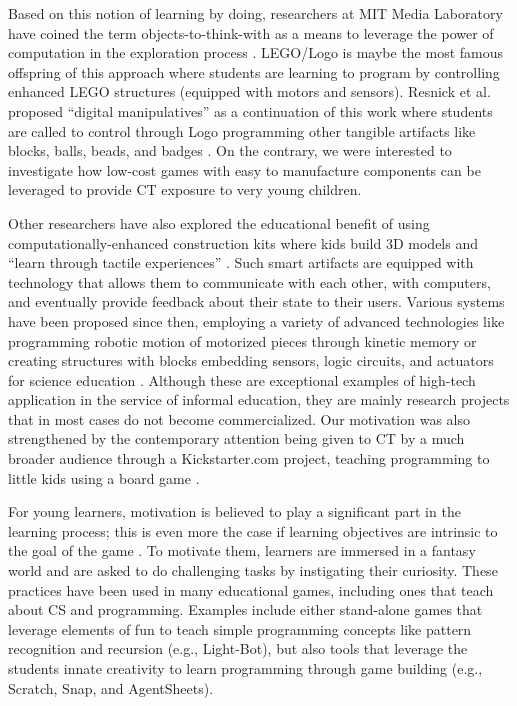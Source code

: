 \documentclass{acm_proc_article-sp}
\begin{document}
Based on this notion of learning by doing, researchers at MIT Media Laboratory have coined the term objects-to-think-with as a means to leverage the power of computation in the exploration process \cite{resnick1998digital,schweikardt2006roblocks}. LEGO/Logo is maybe the most famous offspring of this approach where students are learning to program by controlling enhanced LEGO structures (equipped with motors and sensors).
Resnick et al. proposed ``digital manipulatives'' as a continuation of this work where students are called to control through Logo programming other tangible artifacts like blocks, balls, beads, and badges \cite{liebschner1992child}.
On the contrary, we were interested to investigate how low-cost games with easy to manufacture components can be leveraged to provide CT exposure to very young children. 

Other researchers have also explored the educational benefit of using computationally-enhanced construction kits where kids build 3D models and ``learn through tactile experiences'' \cite{eisenberg2002computationally}.
Such smart artifacts are equipped with technology that allows them to communicate with each other, with computers, and eventually provide feedback about their state to their users.
Various systems have been proposed since then, employing a variety of advanced technologies like programming robotic motion of motorized pieces through kinetic memory \cite{raffle2004topobo} or creating structures with blocks embedding sensors, logic circuits, and actuators for science education \cite{schweikardt2006roblocks}.
Although these are exceptional examples of high-tech application in the service of informal education, they are mainly research projects that in most cases do not become commercialized.
Our motivation was also strengthened by the contemporary attention being given to CT by a much broader audience through a Kickstarter.com project, teaching programming to little kids using a board game \cite{robotturtles}.

For young learners, motivation is believed to play a significant part in the learning process; this is even more the case if learning objectives are intrinsic to the goal of the game \cite{malone1987making}.
To motivate them, learners are immersed in a fantasy world and are asked to do challenging tasks by instigating their curiosity.
These practices have been used in many educational games, including ones that teach about CS and programming.
Examples include either stand-alone games that leverage elements of fun to teach simple programming concepts like pattern recognition and recursion (e.g., Light-Bot), but also tools that leverage the students innate creativity to learn programming through game building (e.g., Scratch, Snap, and AgentSheets).
\end{document}
